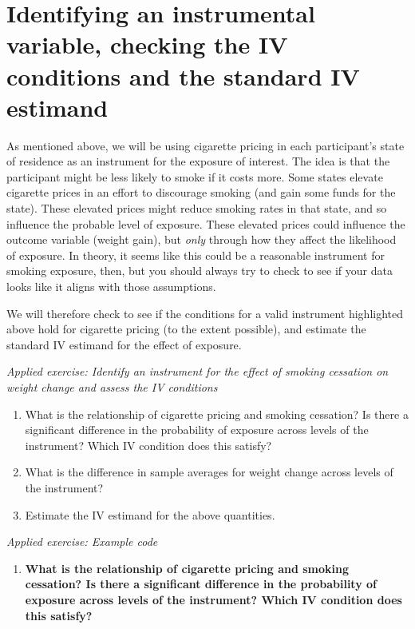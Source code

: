 \documentclass[
]{book}
\providecommand{\tightlist}{%
  \setlength{\itemsep}{0pt}\setlength{\parskip}{0pt}}
\begin{document}
\hypertarget{identifying-an-instrumental-variable-checking-the-iv-conditions-and-the-standard-iv-estimand}{%
\section{Identifying an instrumental variable, checking the IV conditions and the standard IV estimand}\label{identifying-an-instrumental-variable-checking-the-iv-conditions-and-the-standard-iv-estimand}}

As mentioned above, we will be using cigarette pricing in each participant's state of residence as an instrument for the exposure of interest. The idea is that the
participant might be less likely to smoke if it costs more. Some states elevate
cigarette prices in an effort to discourage smoking (and gain some funds for the
state). These elevated prices might reduce smoking rates in that state, and so
influence the probable level of exposure. These elevated prices could influence
the outcome variable (weight gain), but \emph{only} through how they affect the
likelihood of exposure. In theory, it seems like this could be a reasonable
instrument for smoking exposure, then, but you should always try to check to
see if your data looks like it aligns with those assumptions.

We will therefore check to see if the conditions for a valid instrument highlighted above hold for cigarette pricing (to the extent possible), and estimate the standard IV estimand for the effect of exposure.

\emph{Applied exercise: Identify an instrument for the effect of smoking cessation on weight change and assess the IV conditions}

\begin{enumerate}
\def\labelenumi{\arabic{enumi}.}
\tightlist
\item
  What is the relationship of cigarette pricing and smoking cessation? Is there a significant difference in the probability of exposure across levels of the instrument? Which IV condition does this satisfy?
\item
  What is the difference in sample averages for weight change across levels of the instrument?
\item
  Estimate the IV estimand for the above quantities.
\end{enumerate}

\emph{Applied exercise: Example code}

\begin{enumerate}
\def\labelenumi{\arabic{enumi}.}
\tightlist
\item
  \textbf{What is the relationship of cigarette pricing and smoking cessation? Is there a significant difference in the probability of exposure across levels of the instrument? Which IV condition does this satisfy?}
\end{enumerate}
\end{document}
